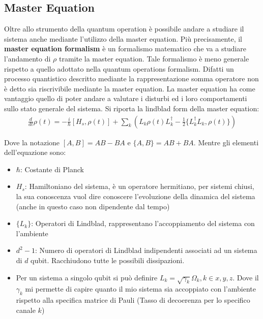 \subsection{Master Equation}
Oltre allo strumento della quantum operation è possibile andare a studiare il sistema anche mediante l'utilizzo della master equation. Più precisamente, il \textbf{master equation formalism} è un formalismo matematico che va a studiare l'andamento di \(\rho\) tramite la master equation. Tale formalismo è meno generale rispetto a quello adottato nella quantum operations formalism. Difatti un processo quantistico descritto mediante la rappresentazione somma operatore non è detto sia riscrivibile mediante la master equation. La master equation ha come vantaggio quello di poter andare a valutare i disturbi ed i loro comportamenti sullo stato generale del sistema. Si riporta la lindblad form della master equation:
\begin{gather*}
    \frac{d}{dt}\rho(t) = -\frac{i}{\hbar}\left[H_s, \rho(t)\right] + \sum_k \left(L_k \rho(t)L_k^\dagger - \frac{1}{2}\{L_k^\dagger L_k, \rho(t)\}\right)
\end{gather*}

Dove la notazione \([A,B] = AB - BA\) e \(\{A,B\} = AB + BA\). Mentre gli elementi dell'equazione sono:
\begin{itemize}
    \item \(\hbar\): Costante di Planck
    \item \(H_s\): Hamiltoniano del sistema, è un operatore hermitiano, per sistemi chiusi, la sua conoscenza vuol dire conoscere l'evoluzione della dinamica del sistema (anche in questo caso non dipendente dal tempo)
    
    \item \(\{L_k\}\): Operatori di Lindblad, rappresentano l'accoppiamento del sistema con l'ambiente
    
    \item \(d^2-1\): Numero di operatori di Lindblad indipendenti associati ad un sistema di \(d\) qubit. Racchiudono tutte le possibili dissipazioni.
    
    \item Per un sistema a singolo qubit si può definire \(L_k = \sqrt{\gamma_k}\Omega_k, k \in {x,y,z}\). Dove il \(\gamma_k\) mi permette di capire quanto il mio sistema sia accoppiato con l'ambiente rispetto alla specifica matrice di Pauli (Tasso di decoerenza per lo specifico canale \(k\))
\end{itemize}

